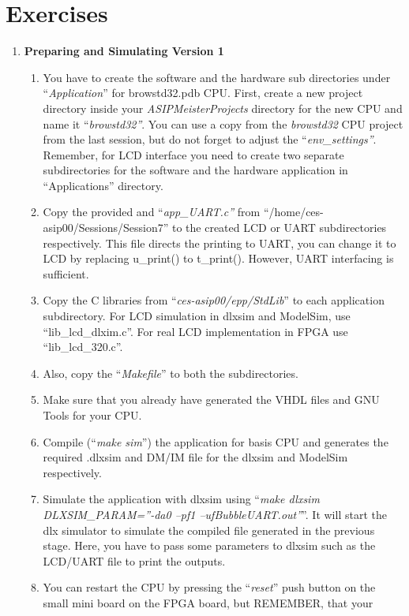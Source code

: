 \section*{Exercises}
\begin{enumerate}
\item \textbf{Preparing and Simulating Version 1}
	\begin{enumerate}
		\item
		You have to create the software and the hardware sub directories
		under ``\emph{Application}'' for browstd32.pdb CPU. First, create a
		new project directory inside your \emph{ASIPMeisterProjects}
		directory for the new CPU and name it ``\emph{browstd32''}. You can
		use a copy from the \emph{browstd32} CPU project from the last
		session, but do not forget to adjust the ``\emph{env\_settings''}.
		Remember, for LCD interface you need to create two separate
		subdirectories for the software and the hardware application in
		``Applications'' directory.
		\item
		Copy the provided and ``\emph{app\_UART.c''} from
		``/home/ces-asip00/Sessions/Session7'' to the created LCD or UART
		subdirectories respectively. This file directs the printing to UART,
		you can change it to LCD by replacing u\_print() to t\_print().
		However, UART interfacing is sufficient.
		\item
		Copy the C libraries from ``\emph{ces-asip00/epp/StdLib}'' to each
		application subdirectory. For LCD simulation in dlxsim and ModelSim,
		use ``lib\_lcd\_dlxim.c''. For real LCD implementation in FPGA use
		``lib\_lcd\_320.c''.
		\item
		Also, copy the ``\emph{Makefile}'' to both the subdirectories.
		\item
		Make sure that you already have generated the VHDL files and GNU
		Tools for your CPU.
		\item
		Compile (``\emph{make sim}'') the application for basis CPU and
		generates the required .dlxsim and DM/IM file for the dlxsim and
		ModelSim respectively.
		\item
		Simulate the application with dlxsim using ``\emph{make dlxsim
			DLXSIM\_PARAM=''-da0 --pf1 --ufBubbleUART.out''}''. It will start
		the dlx simulator to simulate the compiled file generated in the
		previous stage. Here, you have to pass some parameters to dlxsim
		such as the LCD/UART file to print the outputs.
		\item
		You can restart the CPU by pressing the ``\emph{reset}'' push button
		on the small mini board on the FPGA board, but REMEMBER, that your

\end{enumerate}
\end{enumerate}
